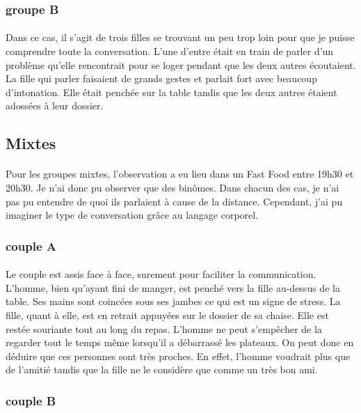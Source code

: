 \subsubsection{groupe B}
\paragraph{}
	Dans ce cas, il s’agit de trois filles se trouvant un peu trop loin pour que je puisse comprendre toute la conversation. L’une d’entre était en train de parler d’un problème qu’elle rencontrait pour se loger pendant que les deux autres écoutaient. La fille qui parler faisaient de grands gestes et parlait fort avec beaucoup d’intonation. Elle était penchée sur la table tandis que les deux autres étaient adossées à leur dossier. 

\subsection{Mixtes}
\paragraph{}
Pour les groupes mixtes, l’observation a eu lieu dans un Fast Food entre 19h30 et 20h30. Je n’ai donc pu observer que des binômes. Dans chacun des cas, je n’ai pas pu entendre de quoi ils parlaient à cause de la distance. Cependant, j’ai pu imaginer le type de conversation grâce au langage corporel.
\subsubsection{couple A}
\paragraph{}
Le couple est assis face à face, surement pour faciliter la communication. L’homme, bien qu’ayant fini de manger, est penché vers la fille au-dessus de la table. Ses mains sont coincées sous ses jambes ce qui est un signe de stress. La fille, quant à elle, est en retrait appuyées sur le dossier de sa chaise. Elle est restée souriante tout au long du repas. L’homme ne peut s’empêcher de la regarder tout le temps même lorsqu’il a débarrassé les plateaux. On peut donc en déduire que ces personnes sont très proches. En effet, l’homme voudrait plus que de l’amitié tandis que la fille ne le considère que comme un très bon ami.  
\subsubsection{couple B}

